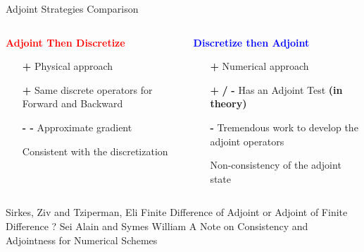 
\begin{frame}{Adjoint Strategies Comparison}
  \begin{columns}
    \begin{column}[t]{0.5\textwidth}
      \textbf{\textcolor{red}{Adjoint Then Discretize}}
      \vspace{0.5cm}
      \begin{itemize}
      \item[\textcolor{\mygreen}{\textbf{+}}] Physical approach
      \item[\textcolor{\mygreen}{\textbf{+}}] Same discrete operators for Forward and Backward
      \item[\textbf{- -}] Approximate gradient \cite{Sirkes}
      \item[\textcolor{black}{\textbullet}] Consistent with the discretization
      \end{itemize}
      \vspace{0.5cm}
    \end{column}\vrule \hfill
    \begin{column}[t]{0.5\textwidth}
      \textbf{\textcolor{blue}{Discretize then Adjoint}}
      \vspace{0.5cm}
      \begin{itemize}
      \item[\textcolor{\mygreen}{\textbf{+}}] Numerical approach
      \item[\textcolor{\mygreen}{\textbf{+}} \textcolor{black}{\textbf{/}} \textbf{-}] Has an Adjoint Test {\small{\textbf{(in theory)}}}
      \item[\textbf{-}] Tremendous work to develop the adjoint operators
      \item[\textcolor{black}{\textbullet}] Non-consistency of the adjoint state \cite{Set1997Feb}
      \end{itemize}
    \end{column}
  \end{columns}

  \vfill
  \tiny
  \begin{thebibliography}{2}
     Sirkes, Ziv and Tziperman, Eli
      \newblock Finite Difference of Adjoint or Adjoint of Finite Difference ?
   Sei Alain and Symes William
    \newblock A Note on Consistency and Adjointness for Numerical Schemes
  \end{thebibliography}

\end{frame}
